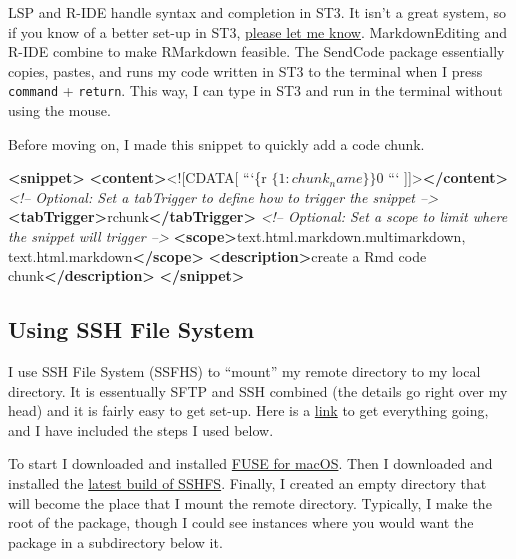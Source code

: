 \documentclass[]{book}
\newenvironment{Shaded}{\begin{snugshade}}{\end{snugshade}}
\newcommand{\BaseNTok}[1]{\textcolor[rgb]{0.00,0.00,0.81}{#1}}
\newcommand{\CommentTok}[1]{\textcolor[rgb]{0.56,0.35,0.01}{\textit{#1}}}
\newcommand{\KeywordTok}[1]{\textcolor[rgb]{0.13,0.29,0.53}{\textbf{#1}}}
\newcommand{\NormalTok}[1]{#1}
\begin{document}
LSP and R-IDE handle syntax and completion in ST3. It isn't a great system, so if you know of a better set-up in ST3, \href{https://github.com/jhrcook/package-as-analysis/issues}{please let me know}. MarkdownEditing and R-IDE combine to make RMarkdown feasible. The SendCode package essentially copies, pastes, and runs my code written in ST3 to the terminal when I press \texttt{command} + \texttt{return}. This way, I can type in ST3 and run in the terminal without using the mouse.

Before moving on, I made this snippet to quickly add a code chunk.

\begin{Shaded}
\begin{Highlighting}[]
\KeywordTok{<snippet>}
        \KeywordTok{<content>}\BaseNTok{<![CDATA[}
\NormalTok{```\{r $\{1:chunk_name\}\}}
\NormalTok{$0}
\NormalTok{```}
\BaseNTok{]]>}\KeywordTok{</content>}
        \CommentTok{<!-- Optional: Set a tabTrigger to define how to trigger the snippet -->}
        \KeywordTok{<tabTrigger>}\NormalTok{rchunk}\KeywordTok{</tabTrigger>}
        \CommentTok{<!-- Optional: Set a scope to limit where the snippet will trigger -->}
        \KeywordTok{<scope>}\NormalTok{text.html.markdown.multimarkdown, text.html.markdown}\KeywordTok{</scope>}
        \KeywordTok{<description>}\NormalTok{create a Rmd code chunk}\KeywordTok{</description>}
\KeywordTok{</snippet>}
\end{Highlighting}
\end{Shaded}

\hypertarget{using-ssh-file-system}{%
\subsection{Using SSH File System}\label{using-ssh-file-system}}

I use SSH File System (SSFHS) to ``mount'' my remote directory to my local directory. It is essentually SFTP and SSH combined (the details go right over my head) and it is fairly easy to get set-up. Here is a \href{https://github.com/osxfuse/osxfuse/wiki/SSHFS}{link} to get everything going, and I have included the steps I used below.

To start I downloaded and installed \href{https://osxfuse.github.io}{FUSE for macOS}. Then I downloaded and installed the \href{https://github.com/osxfuse/sshfs/releases}{latest build of SSHFS}. Finally, I created an empty directory that will become the place that I mount the remote directory. Typically, I make the root of the package, though I could see instances where you would want the package in a subdirectory below it.
\end{document}
